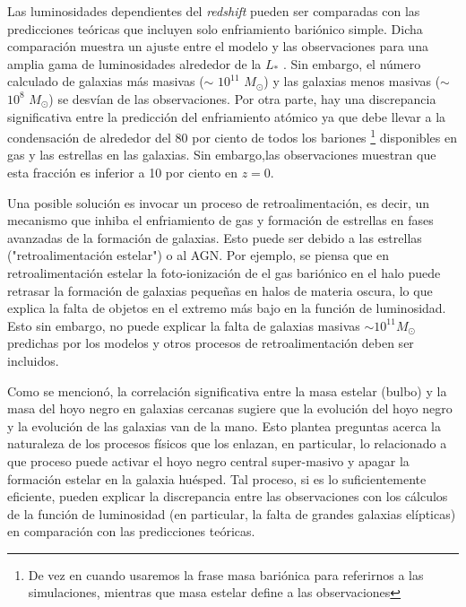 \bigskip

\noindent Las luminosidades dependientes del \textsl{redshift} pueden ser comparadas con las predicciones teóricas que incluyen
solo enfriamiento bariónico simple. Dicha comparación muestra un ajuste entre el modelo y las observaciones para una amplia
gama de luminosidades alrededor de la $L_{*}$ . Sin embargo, el número calculado de galaxias más masivas ($\sim$ $10^{11}$ $M_{\odot}$) y las galaxias menos masivas ($\sim$ $10^{8}$ $M_{\odot}$) se desvían de las observaciones.
Por otra parte, hay una discrepancia significativa entre la predicción del enfriamiento atómico ya que debe llevar a la condensación
de alrededor del 80 por ciento de todos los
bariones \footnote{De vez en cuando usaremos la frase masa bariónica para referirnos a las simulaciones,
mientras que masa estelar define a las observaciones}
disponibles en gas y las estrellas en las galaxias. Sin embargo,las observaciones muestran que
esta fracción es inferior a 10 por ciento en $z = 0$.

\bigskip

\noindent Una posible solución es invocar un proceso de retroalimentación, es decir, un mecanismo que
inhiba el enfriamiento de gas y formación de estrellas en fases avanzadas de la formación de galaxias. Esto puede ser debido
a las estrellas ("retroalimentación estelar") o al AGN. Por
ejemplo, se piensa que en retroalimentación estelar la foto-ionización de
el gas bariónico en el halo puede retrasar la formación de galaxias pequeñas
en halos de materia oscura, lo que explica la falta de objetos en el extremo más bajo en la función de luminosidad.
Esto sin embargo, no puede explicar la falta de galaxias masivas $\sim 10^{11} M_{\odot}$ predichas por los modelos y otros procesos
de retroalimentación deben ser incluidos.


\bigskip

\noindent Como se mencionó, la correlación significativa entre la masa estelar (bulbo) y la masa del hoyo negro
en galaxias cercanas sugiere que la evolución del hoyo negro y la evolución de las galaxias van de la mano.
Esto plantea preguntas acerca la naturaleza de los procesos físicos que los enlazan, en particular, lo relacionado a que proceso
puede activar el hoyo negro central super-masivo  y apagar la formación estelar  en la galaxia huésped. Tal
proceso, si es lo suficientemente eficiente, pueden explicar la discrepancia entre las observaciones
con los cálculos de la función de luminosidad (en particular, la falta de grandes galaxias elípticas)
en comparación con las predicciones teóricas.

